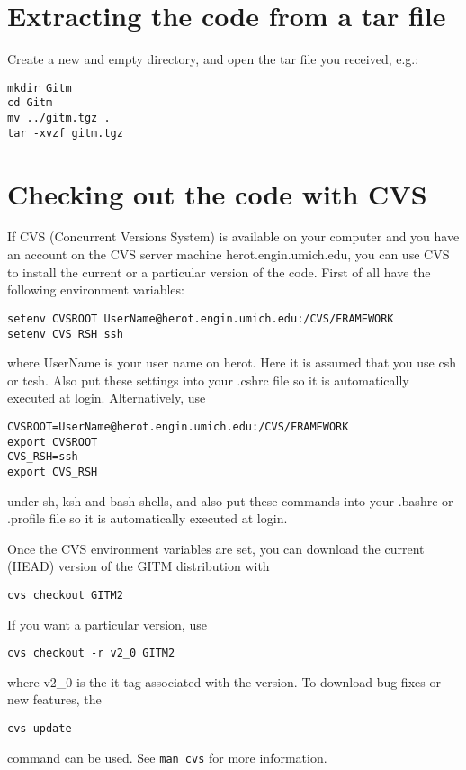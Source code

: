 \section{Extracting the code from a tar file}

Create a new and empty directory, and open the tar file you received,
e.g.:
\begin{verbatim}
mkdir Gitm 
cd Gitm 
mv ../gitm.tgz . 
tar -xvzf gitm.tgz 
\end{verbatim}

\section{Checking out the code with CVS}

If CVS (Concurrent Versions System) is available on your computer and
you have an account on the CVS server machine herot.engin.umich.edu,
you can use CVS to install the current or a particular version of the
code. First of all have the following environment variables:
\begin{verbatim}
setenv CVSROOT UserName@herot.engin.umich.edu:/CVS/FRAMEWORK
setenv CVS_RSH ssh
\end{verbatim}
where UserName is your user name on herot. Here it is assumed that you
use csh or tcsh. Also put these settings into your .cshrc file so it
is automatically executed at login. Alternatively, use
\begin{verbatim}
CVSROOT=UserName@herot.engin.umich.edu:/CVS/FRAMEWORK 
export CVSROOT 
CVS_RSH=ssh 
export CVS_RSH
\end{verbatim}
under sh, ksh and bash shells, and also put these commands into your
.bashrc or .profile file so it is automatically executed at login.

Once the CVS environment variables are set, you can download the
current (HEAD) version of the GITM distribution with
\begin{verbatim}
cvs checkout GITM2
\end{verbatim}

If you want a particular version, use
\begin{verbatim}
cvs checkout -r v2_0 GITM2
\end{verbatim}
where v2\_0 is the it tag associated with the version. To download bug
fixes or new features, the
\begin{verbatim}
cvs update 
\end{verbatim}
command can be used. See {\tt man cvs} for more information.


